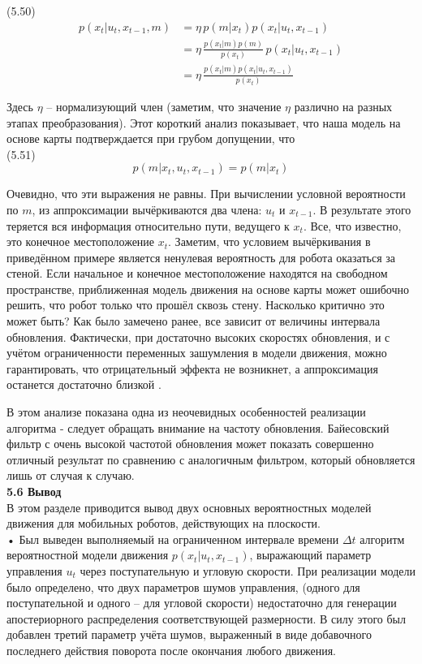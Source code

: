 \documentclass[10pt,a4paper]{article}
\begin{document}
(5.50)
\begin{equation*}
\begin{split}
p(x_t|u_t,x_{t-1},m)&=\eta\,p(m|x_t)p(x_t|u_t,x_{t-1})\\
&=\eta\,\frac{p(x_t|m)p(m)}{p(x_t)}\,p(x_t|u_t,x_{t-1})\\
&=\eta\,\frac{p(x_t|m)p(x_t|u_t,x_{t-1})}{p(x_t)}
\end{split}
\end{equation*}

Здесь $\eta$ – нормализующий член (заметим, что значение $\eta$ различно на разных этапах преобразования). Этот короткий анализ показывает, что наша модель на основе карты подтверждается при грубом допущении, что \\

(5.51)
$$p(m|x_t,u_t,x_{t-1})=p(m|x_t)$$

Очевидно, что эти выражения не равны. При вычислении условной вероятности по $m$, из аппроксимации вычёркиваются два члена: $u_t$ и $x_{t-1}$. В результате этого теряется вся информация относительно пути, ведущего к $x_t$. Все, что известно, это конечное местоположение $x_t$. Заметим, что условием вычёркивания в приведённом примере является ненулевая вероятность для робота оказаться за стеной. Если начальное и конечное местоположение находятся на свободном пространстве, приближенная модель движения на основе карты может ошибочно решить, что робот только что прошёл сквозь стену. Насколько критично это может быть? Как было замечено ранее, все зависит от величины интервала обновления. Фактически, при достаточно высоких скоростях обновления, и с учётом ограниченности переменных зашумления в модели движения, можно гарантировать, что отрицательный эффекта не возникнет, а аппроксимация останется достаточно близкой . 

В этом анализе показана одна из неочевидных особенностей реализации алгоритма -  следует обращать внимание на частоту обновления. Байесовский фильтр с очень высокой частотой обновления может показать совершенно отличный результат по сравнению с аналогичным фильтром, который обновляется лишь от случая к случаю.\\

\textbf{5.6 Вывод} \\

В этом разделе приводится вывод двух основных вероятностных моделей движения для мобильных роботов, действующих на плоскости. \\

• Был выведен  выполняемый на ограниченном интервале времени $\varDelta t$ алгоритм вероятностной модели движения $p(x_t | u_t, x_{t-1})$, выражающий параметр управления $u_t$ через поступательную и угловую скорости. При реализации модели было определено, что двух параметров шумов управления, (одного для поступательной и одного – для угловой скорости) недостаточно для генерации апостериорного распределения соответствующей размерности. В силу этого был добавлен третий параметр учёта шумов, выраженный в виде добавочного последнего действия поворота после окончания любого движения. \\
\end{document}
